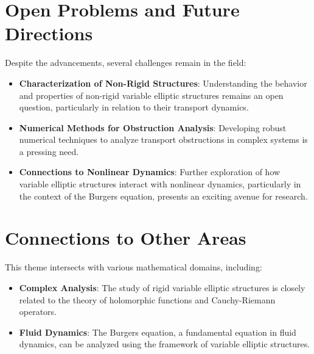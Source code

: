 \documentclass[11pt,a4paper]{article}
\begin{document}
\section{Open Problems and Future Directions}

Despite the advancements, several challenges remain in the field:

\begin{itemize}
\item \textbf{Characterization of Non-Rigid Structures}: Understanding the behavior and properties of non-rigid variable elliptic structures remains an open question, particularly in relation to their transport dynamics.
\end{itemize}

\begin{itemize}
\item \textbf{Numerical Methods for Obstruction Analysis}: Developing robust numerical techniques to analyze transport obstructions in complex systems is a pressing need.
\end{itemize}

\begin{itemize}
\item \textbf{Connections to Nonlinear Dynamics}: Further exploration of how variable elliptic structures interact with nonlinear dynamics, particularly in the context of the Burgers equation, presents an exciting avenue for research.
\end{itemize}

\section{Connections to Other Areas}

This theme intersects with various mathematical domains, including:

\begin{itemize}
\item \textbf{Complex Analysis}: The study of rigid variable elliptic structures is closely related to the theory of holomorphic functions and Cauchy-Riemann operators.
\end{itemize}

\begin{itemize}
\item \textbf{Fluid Dynamics}: The Burgers equation, a fundamental equation in fluid dynamics, can be analyzed using the framework of variable elliptic structures.
\end{itemize}
\end{document}
